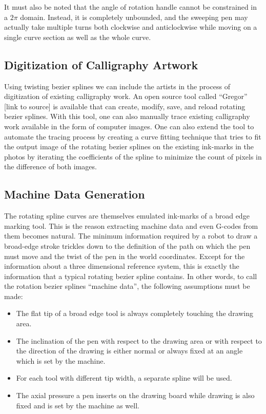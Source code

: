     It must also be noted that the angle of rotation handle cannot be constrained in a $2\pi$ domain. Instead, it is completely unbounded, and the sweeping pen may actually take multiple turns both clockwise and anticlockwise while moving on a single curve section as well as the whole curve.

    \subsection{Digitization of Calligraphy Artwork}
    Using twisting bezier splines we can include the artists in the process of digitization of existing calligraphy work. An open source tool called ``Gregor'' [link to source] is available that can create, modify, save, and reload rotating bezier splines. With this tool, one can also manually trace existing calligraphy work available in the form of computer images. One can also extend the tool to automate the tracing process by creating a curve fitting technique that tries to fit the output image of the rotating bezier splines on the existing ink-marks in the photos by iterating the coefficients of the spline to minimize the count of pixels in the difference of both images.

    \subsection{Machine Data Generation}
    \label{ExplorationPoints1}
    The rotating spline curves are themselves emulated ink-marks of a broad edge marking tool. This is the reason extracting machine data and even G-codes from them becomes natural. The minimum information required by a robot to draw a broad-edge stroke trickles down to the definition of the path on which the pen must move and the twist of the pen in the world coordinates. Except for the information about a three dimensional reference system, this is exactly the information that a typical rotating bezier spline contains. In other words, to call the rotation bezier splines ``machine data'', the following assumptions must be made:

    \begin{itemize}
        \item The flat tip of a broad edge tool is always completely touching the drawing area.
    	\item The inclination of the pen with respect to the drawing area or with respect to the direction of the drawing is either normal or always fixed at an angle which is set by the machine.
    	\item For each tool with different tip width, a separate spline will be used.
    	\item The axial pressure a pen inserts on the drawing board while drawing is also fixed and is set by the machine as well.

    \end{itemize}

